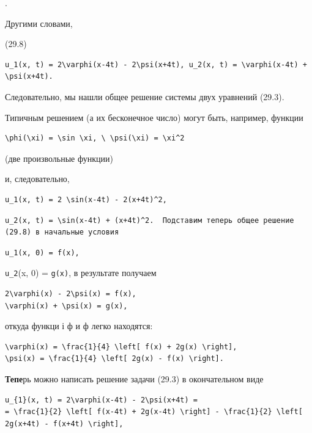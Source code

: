 \documentclass[
  ukrainian,
]{article}
\begin{document}
.

Другими словами,

(29.8)

\begin{verbatim}
u_1(x, t) = 2\varphi(x-4t) - 2\psi(x+4t), u_2(x, t) = \varphi(x-4t) + \psi(x+4t).
\end{verbatim}

Следовательно, мы нашли общее решение системы двух уравнений (29.3).

Типичным решением (а их бесконечное число) могут быть, например, функции

\begin{verbatim}
\phi(\xi) = \sin \xi, \ \psi(\xi) = \xi^2
\end{verbatim}

(две произвольные функции)

и, следовательно,

\begin{verbatim}
u_1(x, t) = 2 \sin(x-4t) - 2(x+4t)^2,
\end{verbatim}

\begin{verbatim}
u_2(x, t) = \sin(x-4t) + (x+4t)^2.  Подставим теперь общее решение (29.8) в начальные условия
\end{verbatim}

\begin{verbatim}
u_1(x, 0) = f(x),
\end{verbatim}

\texttt{u\_2}(x, 0) = \texttt{g(x)}, в результате получаем

\begin{verbatim}
2\varphi(x) - 2\psi(x) = f(x),
\varphi(x) + \psi(x) = g(x),
\end{verbatim}

откуда функци і ф и ф легко находятся:

\begin{verbatim}
\varphi(x) = \frac{1}{4} \left[ f(x) + 2g(x) \right],
\psi(x) = \frac{1}{4} \left[ 2g(x) - f(x) \right].
\end{verbatim}

\textbf{Тепе}рь можно написать решение задачи (29.3) в окончательном
виде

\begin{verbatim}
u_{1}(x, t) = 2\varphi(x-4t) - 2\psi(x+4t) =
= \frac{1}{2} \left[ f(x-4t) + 2g(x-4t) \right] - \frac{1}{2} \left[ 2g(x+4t) - f(x+4t) \right],
\end{verbatim}
\end{document}
